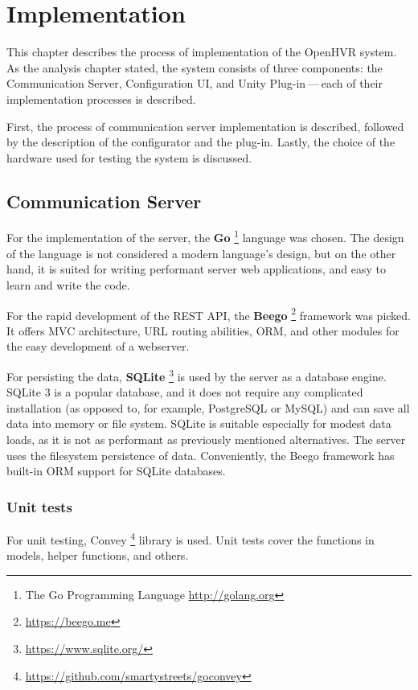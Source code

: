 \chapter{Implementation}

This chapter describes the process of implementation of the OpenHVR system.
As the analysis chapter stated, the system consists of three components: the
Communication Server, Configuration UI, and Unity Plug-in — each of their
implementation processes is described.


First, the process of communication server implementation is described,
followed by the description of the configurator and the plug-in. Lastly, the choice
of the hardware used for testing the system is discussed.


\hypertarget{x-communication-server}{\section{Communication Server}}
For the implementation of the server, the
\textbf{Go} \footnote{The Go Programming Language \href{http://golang.org}{http://golang.org}} language was
chosen. The design of the language is not considered a modern
language’s design, but on the other hand, it is
suited for writing performant server web applications, and easy
to learn and write the code. \hyperlink{gogbu}{}


For the rapid development of the REST API, the \textbf{Beego} \footnote{\href{https://beego.me}{https://beego.me}}
framework was picked. It offers MVC architecture, URL routing abilities, ORM,
and other modules for the easy development of a webserver. \hyperlink{beego}{}


For persisting the data, \textbf{SQLite} \footnote{\href{https://www.sqlite.org/}{https://www.sqlite.org/}}
is used by the server as a database engine. SQLite 3 is
a popular database, and it does not require any complicated installation
(as opposed to, for example, PostgreSQL or MySQL) and can save all data into
memory or file system. SQLite is suitable especially for modest data loads, as
it is not as performant as previously mentioned alternatives. The server uses the
filesystem persistence of data. Conveniently, the Beego framework has built-in
ORM support for SQLite databases.


\hypertarget{x-unit-tests}{\subsection{Unit tests}}
For unit testing, Convey \footnote{\href{https://github.com/smartystreets/goconvey}{https://github.com/smartystreets/goconvey}}
library is used. Unit tests cover the functions in models, helper functions,
and others.


